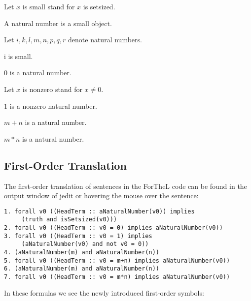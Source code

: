 \documentclass[11pt]{article}
\begin{document}
\begin{forthel}

Let $x$ is small stand for $x$ is setsized.

\begin{signature}  A natural number is a small object.
\end{signature}

Let $i,k,l,m,n,p,q,r$ denote natural numbers.

\begin{lemma} i is small. \end{lemma}

\begin{signature} $0$ is a natural number.
\end{signature}

Let $x$ is nonzero stand for $x \neq 0$.

\begin{signature} $1$ is a nonzero natural number.
\end{signature}

\begin{signature} $m + n$ is a natural number.
\end{signature}

\begin{signature} $m * n$ is a natural number.
\end{signature}
\end{forthel}

\subsection{First-Order Translation}
The first-order translation
of sentences in the ForTheL code can be found in the output
window of jedit or hovering the mouse
over the sentence:
\begin{small}
\begin{verbatim}
1. forall v0 ((HeadTerm :: aNaturalNumber(v0)) implies
     (truth and isSetsized(v0)))
2. forall v0 ((HeadTerm :: v0 = 0) implies aNaturalNumber(v0))
3. forall v0 ((HeadTerm :: v0 = 1) implies
     (aNaturalNumber(v0) and not v0 = 0))
4. (aNaturalNumber(m) and aNaturalNumber(n))
5. forall v0 ((HeadTerm :: v0 = m+n) implies aNaturalNumber(v0))
6. (aNaturalNumber(m) and aNaturalNumber(n))
7. forall v0 ((HeadTerm :: v0 = m*n) implies aNaturalNumber(v0))
\end{verbatim}
\end{small}
In these formulas we see the newly introduced first-order symbols:
\end{document}
